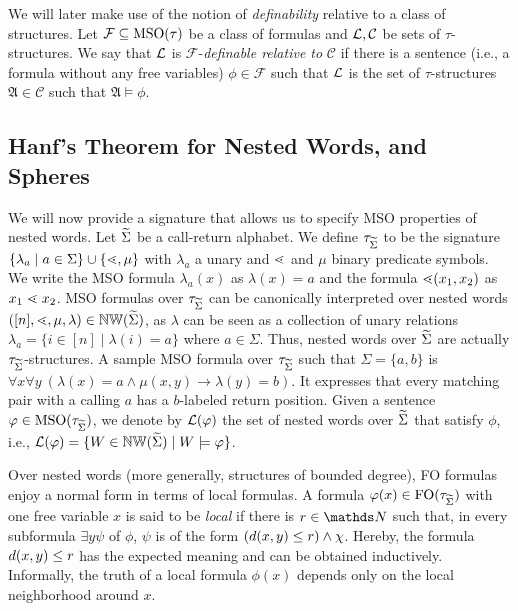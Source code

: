 \documentclass{LMCS}
\begin{document}
We will later make use of the notion of \emph{definability} relative to a
class of structures. Let $\mathcal{F} \subseteq \textup{MSO}(\tau)$ be a class of
formulas and $\mathcal{L},\mathcal{C}$ be sets of $\tau$-structures. We say that
$\mathcal{L}$ is $\mathcal{F}$-\emph{definable relative to} $\mathcal{C}$ if there
is a sentence (i.e., a formula without any free variables) $\phi \in
\mathcal{F}$ such that $\mathcal{L}$ is the set of $\tau$-structures $\mathfrak{A}
\in \mathcal{C}$ such that $\mathfrak{A} \models \phi$.










\subsection{Hanf's Theorem for Nested Words, and Spheres}

We will now provide a signature that allows us to specify MSO properties of
nested words. Let $\widetilde{\Sigma}$ be a call-return alphabet. We define
$\tau_{\widetilde{\Sigma}}$ to be the signature $\{\lambda_a \mid a \in \Sigma\} \cup
\{\mathord{\lessdot},\mu\}$ with $\lambda_a$ a unary and $\mathord{\lessdot}$ and $\mu$ binary
predicate symbols. We write the MSO formula $\lambda_a(x)$ as $\lambda(x)=a$
and the formula $\mathord{\lessdot}(x_1,x_2)$ as $x_1 \mathrel{\lessdot} x_2$. MSO formulas over
$\tau_{\widetilde{\Sigma}}$ can be canonically interpreted over nested words
$([n],\mathord{\lessdot},\mu,\lambda) \in \mathbb{NW}(\widetilde{\Sigma})$, as $\lambda$ can be seen as a
collection of unary relations $\lambda_a = \{i \in [n] \mid \lambda(i) = a\}$
where $a \in \Sigma$. Thus, nested words over $\widetilde{\Sigma}$ are actually
$\tau_{\widetilde{\Sigma}}$-structures. A sample MSO formula over $\tau_{\widetilde{\Sigma}}$ such
that $\Sigma=\{a,b\}$ is $\forall x \forall y~\!(\lambda(x) = a
\mathrel{\wedge} \mu(x,y) \rightarrow \lambda(y)=b)$. It expresses that every
matching pair with a calling $a$ has a $b$-labeled return position. Given a
sentence $\varphi \in \textup{MSO}(\tau_{\widetilde{\Sigma}})$, we denote by $\mathcal{L}(\varphi)$ the set of
nested words over $\widetilde{\Sigma}$ that satisfy $\phi$, i.e., $\mathcal{L}(\varphi) = \{W \in
\mathbb{NW}(\widetilde{\Sigma}) \mid W \models \varphi\}$.



Over nested words (more generally, structures of bounded degree), FO formulas
enjoy a normal form in terms of local formulas. A formula $\varphi(x) \in
\textup{FO}(\tau_{\widetilde{\Sigma}})$ with one free variable $x$ is said to be \emph{local} if there
is $r \in \N$ such that, in every subformula $\exists y \psi$ of $\phi$,
$\psi$ is of the form $(d(x,y) \le r) \wedge \chi$. Hereby, the formula
$d(x,y) \le r$ has the expected meaning and can be obtained inductively.
Informally, the truth of a local formula $\phi(x)$ depends only on the local
neighborhood around $x$.
\end{document}
